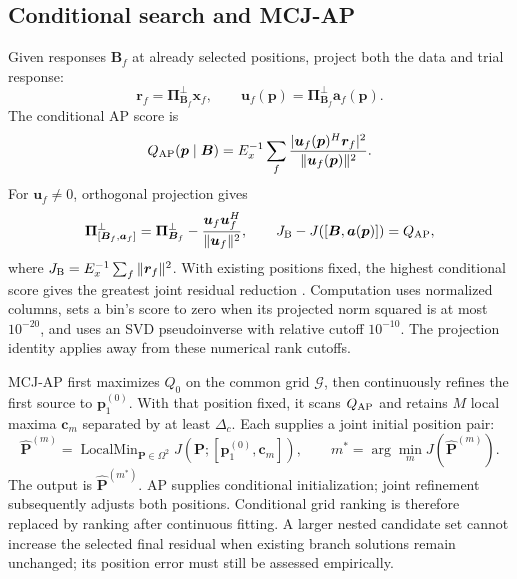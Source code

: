\documentclass[a4paper,fleqn,review]{cas-sc}
\begin{document}
\subsection{Conditional search and MCJ-AP}
Given responses $\bm B_f$ at already selected positions, project both the data and trial response:
\begin{equation}
\bm r_f=\bm\Pi_{\bm B_f}^{\perp}\bm x_f,\qquad
\bm u_f(\bm p)=\bm\Pi_{\bm B_f}^{\perp}\bm a_f(\bm p).
\end{equation}
The conditional AP score is
\begin{equation}
Q_{\rm AP}(\bm p\mid\bm B)=E_x^{-1}\sum_f
 \frac{|\bm u_f(\bm p)^H\bm r_f|^2}{\|\bm u_f(\bm p)\|^2}.
\label{en:conditional}
\end{equation}
For $\bm u_f\ne0$, orthogonal projection gives
\begin{equation}
\bm\Pi_{[\bm B_f,\bm a_f]}^{\perp}
=\bm\Pi_{\bm B_f}^{\perp}-\frac{\bm u_f\bm u_f^H}{\|\bm u_f\|^2},
\qquad J_{\rm B}-J([\bm B,\bm a(\bm p)])=Q_{\rm AP},
\label{en:gain}
\end{equation}
where $J_{\rm B}=E_x^{-1}\sum_f\|\bm r_f\|^2$. With existing positions fixed, the highest conditional score gives the greatest joint residual reduction \cite{ChenHudsonYao2002}. Computation uses normalized columns, sets a bin's score to zero when its projected norm squared is at most $10^{-20}$, and uses an SVD pseudoinverse with relative cutoff $10^{-10}$. The projection identity applies away from these numerical rank cutoffs.

MCJ-AP first maximizes $Q_0$ on the common grid $\mathcal G$, then continuously refines the first source to $\bm p_1^{(0)}$. With that position fixed, it scans $Q_{\rm AP}$ and retains $M$ local maxima $\bm c_m$ separated by at least $\Delta_c$. Each supplies a joint initial position pair:
\begin{equation}
\widehat{\bm P}^{(m)}=\operatorname{LocalMin}_{\bm P\in\Omega^2}
 J(\bm P;[\bm p_1^{(0)},\bm c_m]),\qquad
m^*=\arg\min_m J(\widehat{\bm P}^{(m)}).
\label{en:branch}
\end{equation}
The output is $\widehat{\bm P}^{(m^*)}$. AP supplies conditional initialization; joint refinement subsequently adjusts both positions. Conditional grid ranking is therefore replaced by ranking after continuous fitting. A larger nested candidate set cannot increase the selected final residual when existing branch solutions remain unchanged; its position error must still be assessed empirically.
\end{document}
